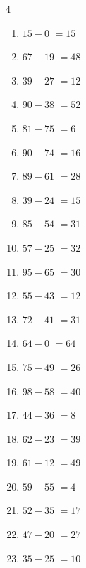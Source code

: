\begin{multicols}{4}
\begin{enumerate}
  \item $15-0$
        $=15$

  \item $67-19$
        $=48$

  \item $39-27$
        $=12$

  \item $90-38$
        $=52$

  \item $81-75$
        $=6$

  \item $90-74$
        $=16$

  \item $89-61$
        $=28$

  \item $39-24$
        $=15$

  \item $85-54$
        $=31$

  \item $57-25$
        $=32$

  \item $95-65$
        $=30$

  \item $55-43$
        $=12$

  \item $72-41$
        $=31$

  \item $64-0$
        $=64$

  \item $75-49$
        $=26$

\columnbreak %

  \item $98-58$
        $=40$

  \item $44-36$
        $=8$

  \item $62-23$
        $=39$

  \item $61-12$
        $=49$

  \item $59-55$
        $=4$

  \item $52-35$
        $=17$

  \item $47-20$
        $=27$

  \item $35-25$
        $=10$


\end{enumerate}
\end{multicols}
